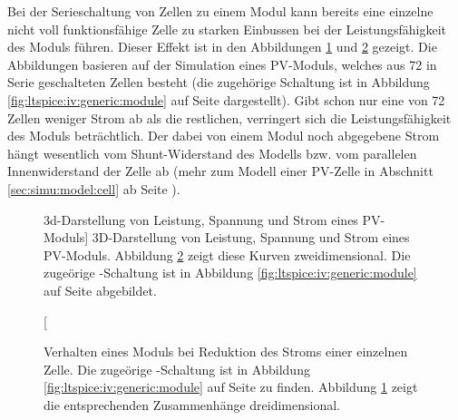Bei  der  Serieschaltung   von  Zellen  zu  einem  Modul   kann  bereits  eine
einzelne   nicht   voll   funktionsf\"ahige   Zelle   zu   starken   Einbussen
bei   der   Leistungsf\"ahigkeit  des   Moduls   f\"uhren\footnotemark. Dieser
Effekt  ist  in   den  Abbildungen  \ref{fig:simu:iv-curves:module:generic:3d}
und    \ref{fig:simu:iv-curves:module:generic}     gezeigt. Die    Abbildungen
basieren   auf    der   Simulation    eines   PV-Moduls,   welches    aus   72
in   Serie   geschalteten   Zellen   besteht   (die   zugeh\"orige   Schaltung
ist    in    Abbildung     \ref{fig:ltspice:iv:generic:module}    auf    Seite
\pageref{fig:ltspice:iv:generic:module}  dargestellt). Gibt   schon  nur  eine
von  72 Zellen  weniger  Strom  ab als  die  restlichen,  verringert sich  die
Leistungsf\"ahigkeit des Moduls betr\"achtlich. Der dabei von einem Modul noch
abgegebene Strom h\"angt wesentlich vom  Shunt-Widerstand des Modells bzw. vom
parallelen Innenwiderstand  der Zelle  ab (mehr zum  Modell einer  PV-Zelle in
Abschnitt \ref{sec:simu:model:cell} ab Seite \pageref{sec:simu:model:cell}).


\begin{figure}[h!tb]
    \centering
    
    \caption
    [3d-Darstellung von Leistung, Spannung und Strom eines PV-Moduls]
    {%
        3D-Darstellung  von  Leistung,  Spannung und  Strom  eines  PV-Moduls.
        Abbildung    \ref{fig:simu:iv-curves:module:generic}    zeigt    diese
        Kurven  zweidimensional.    Die  zuge\"orige  -Schaltung
        ist   in  Abbildung   \ref{fig:ltspice:iv:generic:module}  auf   Seite
        \pageref{fig:ltspice:iv:generic:module} abgebildet.%
    }
    \label{fig:simu:iv-curves:module:generic:3d}
\end{figure}

\begin{figure}[h!tb]
    \centering
    
    \caption[IV- und PV-Kurven eines PV-Moduls bei Leistungseinbruch]{%
        Verhalten   eines    Moduls   bei    Reduktion   des    Stroms   einer
        einzelnen   Zelle.
        Die   zuge\"orige  -Schaltung   ist
        in    Abbildung    \ref{fig:ltspice:iv:generic:module}    auf    Seite
        \pageref{fig:ltspice:iv:generic:module}    zu    finden.     Abbildung
        \ref{fig:simu:iv-curves:module:generic:3d}  zeigt  die  entsprechenden
        Zusammenh\"ange dreidimensional.%
    }
    \label{fig:simu:iv-curves:module:generic}
\end{figure}

